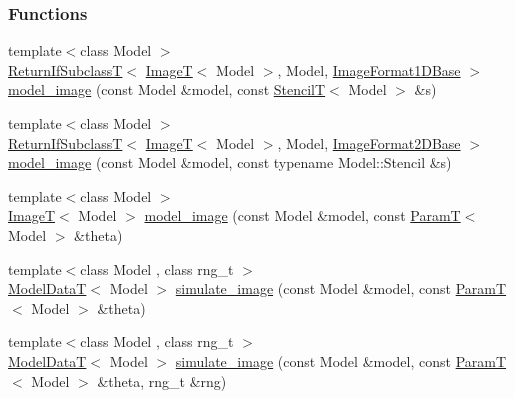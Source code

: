 \subsubsection*{Functions}
\begin{DoxyCompactItemize}
\item 
{\footnotesize template$<$class Model $>$ }\\\hyperlink{namespacemappel_a3b77d227658ba3ba9e16fea6fa6e626d}{Return\+If\+SubclassT}$<$ \hyperlink{namespacemappel_a14658186b77757f3c35a69cb1be6cf4b}{ImageT}$<$ Model $>$, Model, \hyperlink{classmappel_1_1ImageFormat1DBase}{Image\+Format1\+D\+Base} $>$ \hyperlink{namespacemappel_1_1methods_ae92825adbc9f0eea36c2b0afdbf40d66}{model\+\_\+image} (const Model \&model, const \hyperlink{namespacemappel_a3a06598240007876f8c4bf834ad86197}{StencilT}$<$ Model $>$ \&s)
\item 
{\footnotesize template$<$class Model $>$ }\\\hyperlink{namespacemappel_a3b77d227658ba3ba9e16fea6fa6e626d}{Return\+If\+SubclassT}$<$ \hyperlink{namespacemappel_a14658186b77757f3c35a69cb1be6cf4b}{ImageT}$<$ Model $>$, Model, \hyperlink{classmappel_1_1ImageFormat2DBase}{Image\+Format2\+D\+Base} $>$ \hyperlink{namespacemappel_1_1methods_a864e97c52c849c580bccf04401695d13}{model\+\_\+image} (const Model \&model, const typename Model\+::\+Stencil \&s)
\item 
{\footnotesize template$<$class Model $>$ }\\\hyperlink{namespacemappel_a14658186b77757f3c35a69cb1be6cf4b}{ImageT}$<$ Model $>$ \hyperlink{namespacemappel_1_1methods_a4243465f0e58305d795497cbb0499433}{model\+\_\+image} (const Model \&model, const \hyperlink{namespacemappel_a667925cb0d6c0e49f2f035cc5a9a6857}{ParamT}$<$ Model $>$ \&theta)
\item 
{\footnotesize template$<$class Model , class rng\+\_\+t $>$ }\\\hyperlink{namespacemappel_a97f050df953605381ae9c901c3b125f1}{Model\+DataT}$<$ Model $>$ \hyperlink{namespacemappel_1_1methods_a0cc010fbb4c385537756d29b97aef457}{simulate\+\_\+image} (const Model \&model, const \hyperlink{namespacemappel_a667925cb0d6c0e49f2f035cc5a9a6857}{ParamT}$<$ Model $>$ \&theta)
\item 
{\footnotesize template$<$class Model , class rng\+\_\+t $>$ }\\\hyperlink{namespacemappel_a97f050df953605381ae9c901c3b125f1}{Model\+DataT}$<$ Model $>$ \hyperlink{namespacemappel_1_1methods_a1f87830e90f313452ae5e38bc000f4be}{simulate\+\_\+image} (const Model \&model, const \hyperlink{namespacemappel_a667925cb0d6c0e49f2f035cc5a9a6857}{ParamT}$<$ Model $>$ \&theta, rng\+\_\+t \&rng)

\end{DoxyCompactItemize}

